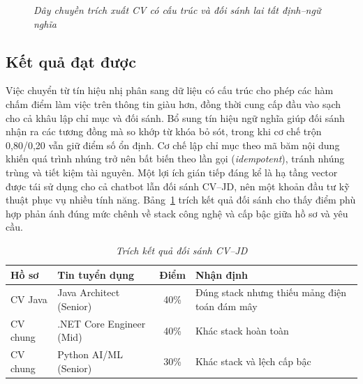 \documentclass[../DoAn.tex]{subfiles}
\begin{document}
\begin{figure}[ht]
  \centering
  \caption{\textit{Dây chuyền trích xuất CV có cấu trúc và đối sánh lai tất định--ngữ nghĩa}}
  \label{fig:ch5-cv-pipeline}
\end{figure}

\subsection{Kết quả đạt được}

Việc chuyển từ tín hiệu nhị phân sang dữ liệu có cấu trúc cho phép các hàm chấm điểm làm việc trên thông tin giàu hơn, đồng thời cung cấp đầu vào sạch cho cả khâu lập chỉ mục và đối sánh. Bổ sung tín hiệu ngữ nghĩa giúp đối sánh nhận ra các tương đồng mà so khớp từ khóa bỏ sót, trong khi cơ chế trộn 0,80/0,20 vẫn giữ điểm số ổn định. Cơ chế lập chỉ mục theo mã băm nội dung khiến quá trình nhúng trở nên bất biến theo lần gọi (\textit{idempotent}), tránh nhúng trùng và tiết kiệm tài nguyên. Một lợi ích gián tiếp đáng kể là hạ tầng vector được tái sử dụng cho cả chatbot lẫn đối sánh CV--JD, nên một khoản đầu tư kỹ thuật phục vụ nhiều tính năng. Bảng~\ref{tab:ch5-match} trích kết quả đối sánh cho thấy điểm phù hợp phản ánh đúng mức chênh về stack công nghệ và cấp bậc giữa hồ sơ và yêu cầu.

\begin{table}[ht]
\centering
\caption{\textit{Trích kết quả đối sánh CV--JD}}
\label{tab:ch5-match}
\renewcommand{\arraystretch}{1.25}
\begin{tabular}{|p{3.2cm}|p{3.6cm}|c|p{4.4cm}|}
\hline
\textbf{Hồ sơ} & \textbf{Tin tuyển dụng} & \textbf{Điểm} & \textbf{Nhận định} \\ \hline
CV Java & Java Architect (Senior) & 40\% & Đúng stack nhưng thiếu mảng điện toán đám mây \\ \hline
CV chung & .NET Core Engineer (Mid) & 40\% & Khác stack hoàn toàn \\ \hline
CV chung & Python AI/ML (Senior) & 30\% & Khác stack và lệch cấp bậc \\ \hline
\end{tabular}
\end{table}
\end{document}
